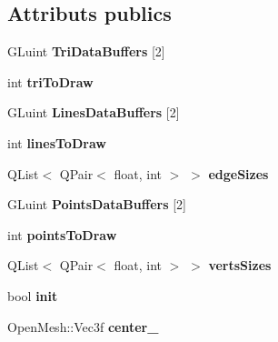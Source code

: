 \subsection*{Attributs publics}
\begin{DoxyCompactItemize}
\item 
\mbox{\label{classMeshViewerWidget_a7e7d7d4c5bc86119273327e6047e3362}} 
G\+Luint {\bfseries Tri\+Data\+Buffers} \mbox{[}2\mbox{]}
\item 
\mbox{\label{classMeshViewerWidget_abfb0d42918e778cbc7e2b59fd02ff408}} 
int {\bfseries tri\+To\+Draw}
\item 
\mbox{\label{classMeshViewerWidget_a6a260f06692206dfd4d3ce7af40d839d}} 
G\+Luint {\bfseries Lines\+Data\+Buffers} \mbox{[}2\mbox{]}
\item 
\mbox{\label{classMeshViewerWidget_a4ffce868cc6dd7504e392d50a3644a96}} 
int {\bfseries lines\+To\+Draw}
\item 
\mbox{\label{classMeshViewerWidget_a9ecf05964cec9732fd59fe8e658bb05e}} 
Q\+List$<$ Q\+Pair$<$ float, int $>$ $>$ {\bfseries edge\+Sizes}
\item 
\mbox{\label{classMeshViewerWidget_a2c3b827a15f3946f46aefb019595d058}} 
G\+Luint {\bfseries Points\+Data\+Buffers} \mbox{[}2\mbox{]}
\item 
\mbox{\label{classMeshViewerWidget_a890952a2fecf87ba85384018df5efa6c}} 
int {\bfseries points\+To\+Draw}
\item 
\mbox{\label{classMeshViewerWidget_aadcc11bb4fec8f1f18c18f0bd7839cb1}} 
Q\+List$<$ Q\+Pair$<$ float, int $>$ $>$ {\bfseries verts\+Sizes}
\item 
\mbox{\label{classMeshViewerWidget_a9959f3fd3a304ed8c213ea8ae9fbe728}} 
bool {\bfseries init}
\item 
\mbox{\label{classMeshViewerWidget_a841cfb397a703ea521cc1debbaa3bfd7}} 
Open\+Mesh\+::\+Vec3f {\bfseries center\+\_\+}

\end{DoxyCompactItemize}
